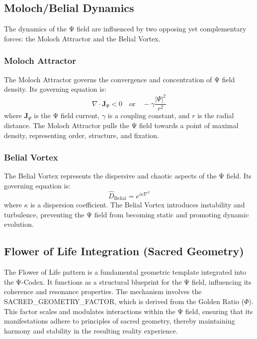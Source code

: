 \documentclass[11pt]{article}
\begin{document}
\subsection{Moloch/Belial Dynamics}
The dynamics of the Ψ field are influenced by two opposing yet complementary forces: the Moloch Attractor and the Belial Vortex.

\subsubsection{Moloch Attractor}
The Moloch Attractor governs the convergence and concentration of Ψ field density. Its governing equation is:
\[
\nabla \cdot \mathbf{J}_\Psi < 0 \quad \text{or} \quad -\gamma \frac{|\Psi|^2}{r^2}
\]
where \( \mathbf{J}_\Psi \) is the Ψ field current, \( \gamma \) is a coupling constant, and \( r \) is the radial distance. The Moloch Attractor pulls the Ψ field towards a point of maximal density, representing order, structure, and fixation.

\subsubsection{Belial Vortex}
The Belial Vortex represents the dispersive and chaotic aspects of the Ψ field. Its governing equation is:
\[
\hat{D}_{\text{Belial}} = e^{i\kappa\nabla^2}
\]
where \( \kappa \) is a dispersion coefficient. The Belial Vortex introduces instability and turbulence, preventing the Ψ field from becoming static and promoting dynamic evolution.

\subsection{Flower of Life Integration (Sacred Geometry)}
The Flower of Life pattern is a fundamental geometric template integrated into the Ψ-Codex. It functions as a structural blueprint for the Ψ field, influencing its coherence and resonance properties. The mechanism involves the SACRED\_GEOMETRY\_FACTOR, which is derived from the Golden Ratio (\(\Phi\)). This factor scales and modulates interactions within the Ψ field, ensuring that its manifestations adhere to principles of sacred geometry, thereby maintaining harmony and stability in the resulting reality experience.
\end{document}
